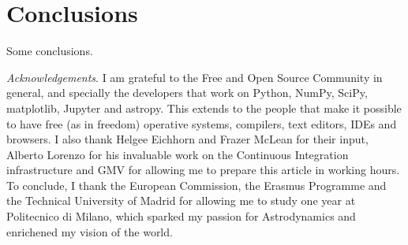 \section{Conclusions}

Some conclusions.

\footnotesize{\textit{Acknowledgements}. I am grateful to the Free and Open Source Community in general, and specially the developers that work on Python, NumPy, SciPy, matplotlib, Jupyter and astropy. This extends to the people that make it possible to have free (as in freedom) operative systems, compilers, text editors, IDEs and browsers. I also thank Helgee Eichhorn and Frazer McLean for their input, Alberto Lorenzo for his invaluable work on the Continuous Integration infrastructure and GMV for allowing me to prepare this article in working hours. To conclude, I thank the European Commission, the Erasmus Programme and the Technical University of Madrid for allowing me to study one year at Politecnico di Milano, which sparked my passion for Astrodynamics and enrichened my vision of the world.}%